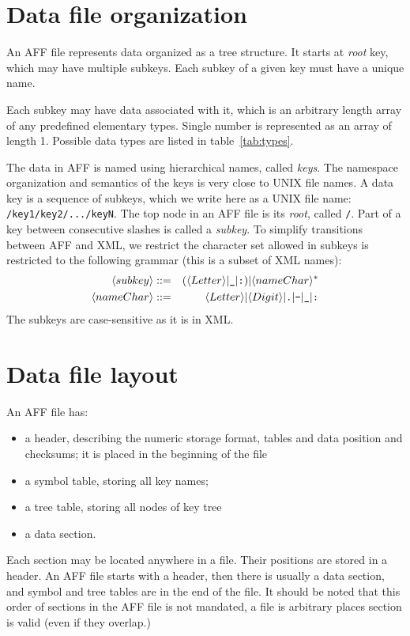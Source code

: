 \documentclass[10pt,letterpaper]{article}
\newcommand{\bi}{\begin{itemize}}
\newcommand{\ei}{\end{itemize}}             %
\newcommand{\term}[1]{\textit{#1}\index{\textit{#1}}}          %
\newcommand{\ctext}[1]{\texttt{#1}}         %
\begin{document}
\section{Data file organization}\label{file-org}
An AFF file represents data organized as a tree structure. 
It starts at \term{root} key, which may have multiple subkeys. 
Each subkey of a given key must have a unique name. 

Each subkey may have data associated with it, which is an arbitrary length array of any
predefined elementary types.
Single number is represented as an array of length 1.
Possible data types are listed in table~\ref{tab:types}.

The data in AFF is named using hierarchical names, called \term{keys}. The namespace organization and semantics of the keys is very close to UNIX file names. A data key is a sequence of subkeys, which
we write here as a UNIX file name: \ctext{/key1/key2/.../keyN}. The top node in an AFF file is its
\term{root}, called \ctext{/}. Part of a key between consecutive slashes is called a \term{subkey}. To simplify transitions between AFF and XML, we restrict the character set allowed in subkeys is restricted to the following grammar (this is a subset of XML names):
\begin{eqnarray*}
\langle subkey \rangle & ::= & (\langle Letter \rangle | \verb|_| | \verb|:| ) | \langle nameChar \rangle^{*} \\
\langle nameChar \rangle & ::= & \langle Letter \rangle | \langle Digit \rangle | \verb|.| | \verb|-| | \verb|_| | \verb|:|
\end{eqnarray*}
The subkeys are case-sensitive as it is in XML.

\section{Data file layout}
An AFF file has:
\bi
\item a header, describing the numeric storage format, tables and data position and checksums; 
it is placed in the beginning of the file
\item a symbol table, storing all key names;
\item a tree table, storing all nodes of key tree
\item a data section.
\ei

Each section may be located anywhere in a file. 
Their positions are stored in a header. 
An AFF file starts with a header, then there is usually a data section, and symbol and tree tables 
are in the end of the file. It should be noted that this order of sections in the AFF file is not mandated, a file is arbitrary places section is valid (even if they overlap.)
\end{document}
